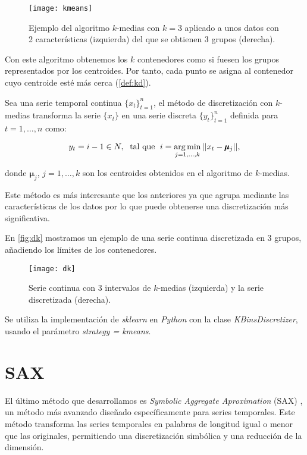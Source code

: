 \begin{figure}[htpb]
  \centering
  \texttt{[image: kmeans]}
  \caption{Ejemplo del algoritmo $k$-medias con $k=3$ aplicado a unos datos con 2 características (izquierda) del que se obtienen 3 grupos (derecha).}
  \label{fig:kmeans}
\end{figure}

Con este algoritmo obtenemos los $k$ contenedores como si fuesen los grupos representados por los centroides. Por tanto, cada punto se asigna al contenedor cuyo centroide esté más cerca (\autoref{def:kd}).

\begin{definicion}
  Sea una serie temporal continua $\{x_t\}_{t = 1}^n$, el método de discretización con $k$-medias transforma la serie $\{x_t\}$ en una serie discreta $\{y_t\}_{t = 1}^n$ definida para $t = 1, \ldots, n$ como:

  $$y_t = i-1 \in N, \; \text{ tal que } \; i = \operatorname*{arg\,min} \limits_{j = 1, \ldots, k} ||x_t - \pmb\mu_j||,$$

  donde $\pmb \mu_j$, $j = 1, \ldots, k$ son los centroides obtenidos en el algoritmo de $k$-medias.
  \label{def:kd}
\end{definicion}

Este método es más interesante que los anteriores ya que agrupa mediante las características de los datos por lo que puede obtenerse una discretización más significativa.

En \autoref{fig:dk} mostramos un ejemplo de una serie continua discretizada en 3 grupos, añadiendo los límites de los contenedores.

\begin{figure}[htpb]
  \centering
  \texttt{[image: dk]}
  \caption{Serie continua con 3 intervalos de $k$-medias (izquierda) y la serie discretizada (derecha).}
  \label{fig:dk}
\end{figure}


Se utiliza la implementación de \emph{sklearn} en \emph{Python} con la clase \emph{KBinsDiscretizer}, usando el parámetro \emph{strategy = kmeans}.

\section{SAX}

El último método que desarrollamos es \emph{Symbolic Aggregate Aproximation} (SAX) \cite{lin2007experiencing}, un método más avanzado diseñado específicamente para series temporales. Este método transforma las series temporales en palabras de longitud igual o menor que las originales, permitiendo una discretización simbólica y una reducción de la dimensión.

